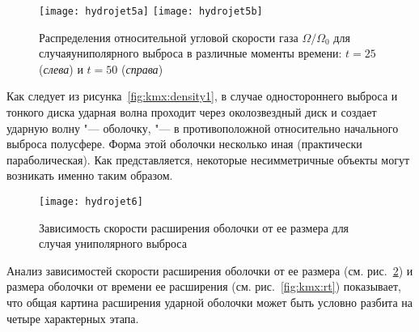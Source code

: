 \begin{figure}[!h]
\centering
\texttt{[image: hydrojet5a]}
\texttt{[image: hydrojet5b]}
\caption{Распределения относительной угловой скорости газа ${\Omega/\Omega_0}$ для случая\plb униполярного выброса в различные моменты времени: ${t = 25}$ (\emph{слева}) и ${t = 50}$ (\emph{справа})}
\label{fig:kmx:omega1}
\end{figure}

Как следует из рисунка~\ref{fig:kmx:density1}, в случае одностороннего выброса
и тонкого диска ударная волна проходит через околозвездный диск и создает
ударную волну "--- оболочку, "--- в противоположной относительно
начального выброса полусфере. Форма этой оболочки несколько иная
(практически параболическая). Как представляется, некоторые
несимметричные объекты могут возникать именно таким образом.

\begin{figure}[!h]
\centering
\texttt{[image: hydrojet6]}
\caption{Зависимость скорости расширения оболочки от ее размера для случая\plb
униполярного выброса}
\label{fig:kmx:vr}
\end{figure}

Анализ зависимостей скорости расширения оболочки от ее размера
(см. рис.~\ref{fig:kmx:vr}) и размера оболочки от времени ее расширения
(см. рис.~\ref{fig:kmx:rt}) показывает, что общая картина расширения
ударной оболочки может быть условно разбита на четыре характерных этапа.

